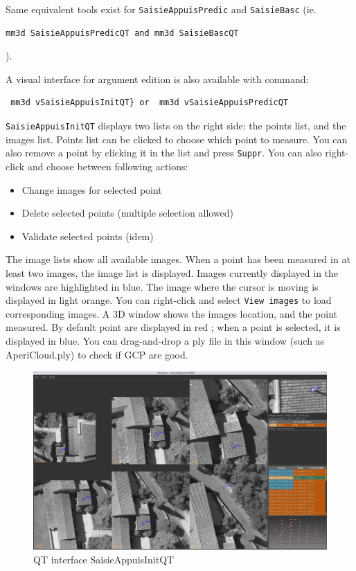 Same equivalent tools exist for {\tt SaisieAppuisPredic} and {\tt SaisieBasc} (ie. \begin{verbatim}mm3d SaisieAppuisPredicQT and mm3d SaisieBascQT\end{verbatim} ).

A visual interface for argument edition is also available with command: \begin{verbatim} mm3d vSaisieAppuisInitQT} or  mm3d vSaisieAppuisPredicQT \end{verbatim}

{\tt SaisieAppuisInitQT} displays two lists on the right side: the points list, and the images list. Points list can be clicked to choose which point to measure. You can also remove a point by clicking it in the list and press {\tt Suppr}. You can also right-click and choose between following actions: 
\begin{itemize}
\item Change images for selected point
\item Delete selected points (multiple selection allowed)
\item Validate selected points (idem)
\end{itemize}
The image lists show all available images. When a point has been measured in at least two images, the image list is displayed.
Images currently displayed in the windows are highlighted in blue. The image where the cursor is moving is displayed in light orange. You can right-click and select {\tt View images} to load corresponding images.
A 3D window shows the images location, and the point measured. By default point are displayed in red ; when a point is selected, it is displayed in blue.
You can drag-and-drop a ply file in this window (such as AperiCloud.ply) to check if GCP are good.

\begin{figure}[H]
\begin{center}
\includegraphics[width=160mm]{FIGS/Saisie/SaisieAppuisInitQT.jpg}
\end{center}
\caption{QT interface SaisieAppuisInitQT}
\label{FIG:SaisieAppuis:QT}
\end{figure}

